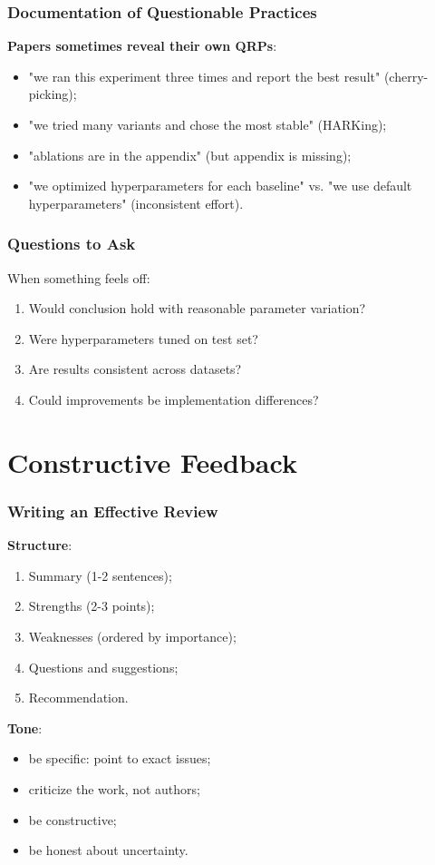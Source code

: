 \documentclass[]{beamer}
\begin{document}
\begin{frame}[fragile]
\frametitle{Documentation of Questionable Practices}
\textbf{Papers sometimes reveal their own QRPs}:
\begin{itemize}
  \item "we ran this experiment three times and report the best result" (cherry-picking);
  \item "we tried many variants and chose the most stable" (HARKing);
  \item "ablations are in the appendix" (but appendix is missing);
  \item "we optimized hyperparameters for each baseline" vs. "we use default hyperparameters" (inconsistent effort).
\end{itemize}

\end{frame}

\begin{frame}[fragile]
\frametitle{Questions to Ask}
When something feels off:

\begin{enumerate}
  \item Would conclusion hold with reasonable parameter variation?
  \item Were hyperparameters tuned on test set?
  \item Are results consistent across datasets?
  \item Could improvements be implementation differences?
\end{enumerate}

\end{frame}

\section{Constructive Feedback}

\begin{frame}[fragile]
\frametitle{Writing an Effective Review}
\textbf{Structure}:
\begin{enumerate}
  \item Summary (1-2 sentences);
  \item Strengths (2-3 points);
  \item Weaknesses (ordered by importance);
  \item Questions and suggestions;
  \item Recommendation.
\end{enumerate}

\textbf{Tone}:
\begin{itemize}
  \item be specific: point to exact issues;
  \item criticize the work, not authors;
  \item be constructive;
  \item be honest about uncertainty.
\end{itemize}

\end{frame}
\end{document}
